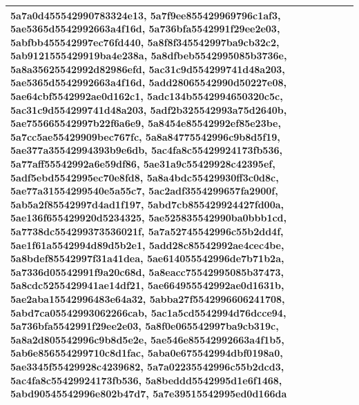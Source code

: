 \documentclass{article} %
\begin{document}
\begin{table}[h!]
\begin{tabular}{|p{12cm}|}
5a7a0d455542990783324e13, 5a7f9ee855429969796c1af3, 5ae5365d5542992663a4f16d, 5a736bfa5542991f29ee2e03, 5abfbb455542997ec76fd440, 5a8f8f345542997ba9cb32c2, 5ab9121555429919ba4e238a, 5a8dfbeb5542995085b3736e, 5a8a35625542992d82986efd, 5ac31c9d554299741d48a203, 5ae5365d5542992663a4f16d, 5add28065542990d50227e08, 5ae64cbf5542992ae0d162c1, 5adc134b5542994650320c5c, 5ac31c9d554299741d48a203, 5adf2b325542993a75d2640b, 5ae755665542997b22f6a6e9, 5a8454e85542992ef85e23be, 5a7cc5ae55429909bec767fc, 5a8a84775542996c9b8d5f19, 5ae377a35542994393b9e6db, 5ac4fa8c55429924173fb536, 5a77aff55542992a6e59df86, 5ae31a9c55429928c42395ef, 5adf5ebd5542995ec70e8fd8, 5a8a4bdc55429930ff3c0d8c, 5ae77a31554299540e5a55c7, 5ac2adf3554299657fa2900f, 5ab5a2f85542997d4ad1f197, 5abd7cb855429924427fd00a, 5ae136f655429920d5234325, 5ae525835542990ba0bbb1cd, 5a7738dc554299373536021f, 5a7a52745542996c55b2dd4f, 5ae1f61a5542994d89d5b2e1, 5add28c85542992ae4cec4be, 5a8bdef85542997f31a41dea, 5ae614055542996de7b71b2a, 5a7336d05542991f9a20c68d, 5a8eacc75542995085b37473, 5a8cdc5255429941ae14df21, 5ae664955542992ae0d1631b, 5ae2aba15542996483e64a32, 5abba27f5542996606241708, 5abd7ca05542993062266cab, 5ac1a5cd5542994d76dcce94, 5a736bfa5542991f29ee2e03, 5a8f0e065542997ba9cb319c, 5a8a2d805542996c9b8d5e2e, 5ae546e85542992663a4f1b5, 5ab6e856554299710c8d1fac, 5aba0e675542994dbf0198a0, 5ae3345f55429928c4239682, 5a7a02235542996c55b2dcd3, 5ac4fa8c55429924173fb536, 5a8beddd5542995d1e6f1468, 5abd90545542996e802b47d7, 5a7e39515542995ed0d166da\\
\bottomrule
    \end{tabular}
\end{table}
\end{document}

